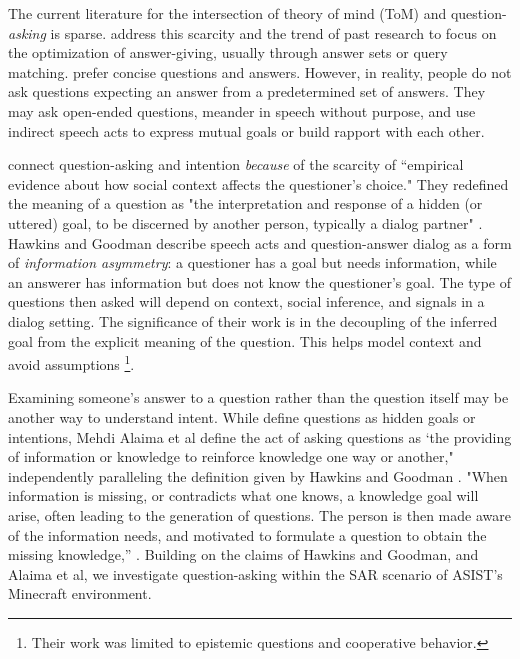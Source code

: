 The current literature for the intersection of theory of mind (ToM) and
question-\emph{asking} is sparse. \citet{hawkins_goodman_2017} address this
scarcity and the trend of past research to focus on the optimization of
answer-giving, usually through answer sets or query matching.  prefer concise
questions and answers. However, in reality, people do not ask questions
expecting an answer from a predetermined set of answers.
They may ask open-ended questions, meander in speech without
purpose, and use indirect speech acts to express mutual goals or build rapport
with each other. 

\cite{hawkins_goodman_2017} connect question-asking and intention
\emph{because} of the scarcity of ``empirical evidence about how social context
affects the questioner’s choice." They redefined the meaning of a question as
"the interpretation and response of a hidden (or uttered) goal, to be discerned
by another person, typically a dialog partner" \citep{hawkins_goodman_2017}.
Hawkins and Goodman describe speech acts and question-answer dialog as a form
of \emph{information asymmetry}: a questioner has a goal but needs information,
while an answerer has information but does not know the questioner’s goal. The
type of questions then asked will depend on context, social inference, and
signals in a dialog setting. The significance of their work is in the
decoupling of the inferred goal from the explicit meaning of the question. This
helps model context and avoid assumptions \footnote{Their work was limited to
epistemic questions and cooperative behavior.}.

Examining someone's answer to a question rather than the question itself may be
another way to understand intent. While \cite{hawkings_goodman_2017} define questions as
hidden goals or intentions, Mehdi Alaima et al define the act of asking
questions as ‘the providing of information or knowledge to reinforce knowledge
one way or another," independently paralleling the definition given by Hawkins
and Goodman . "When information is missing, or contradicts what one knows, a
knowledge goal will arise, often leading to the generation of questions. The
person is then made aware of the information needs, and motivated to formulate
a question to obtain the missing knowledge,” \citep{alaimi_2020}. Building on
the claims of Hawkins and Goodman, and Alaima et al, we investigate
question-asking within the SAR scenario of ASIST’s Minecraft environment. 


